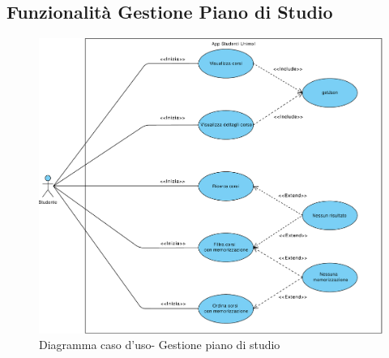 \subsection{Funzionalità Gestione Piano di Studio}
\begin{figure} [h]
	\centering
	\includegraphics[width=6.5in]{imgs/gruppo1/use_case_diagrams/UCD1-gestione_piano_di_studio.pdf}
	\caption{Diagramma caso d'uso- Gestione piano di studio}
	\label{diag:gestionePianoStudio}
\end{figure}
\clearpage
